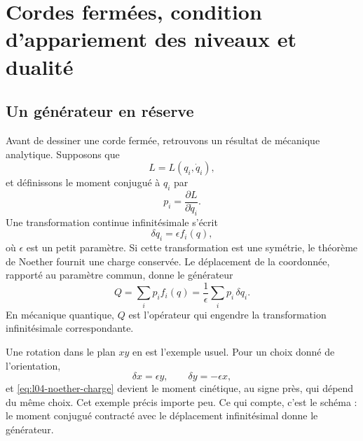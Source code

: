 \chapter{Cordes fermées, condition d’appariement des niveaux et dualité}


\section{Un générateur en réserve}

Avant de dessiner une corde fermée, retrouvons un résultat de mécanique analytique. Supposons que
\begin{equation}
  L=L(q_i,\dot q_i),
\end{equation}
et définissons le moment conjugué à \(q_i\) par
\begin{equation}
  p_i=\frac{\partial L}{\partial\dot q_i}.
\end{equation}
Une transformation continue infinitésimale s’écrit
\begin{equation}
  \delta q_i=\epsilon f_i(q),
  \label{eq:l04-infinitesimal-transformation}
\end{equation}
où \(\epsilon\) est un petit paramètre. Si cette transformation est une symétrie, le théorème de Noether fournit une charge conservée. Le déplacement de la coordonnée, rapporté au paramètre commun, donne le générateur
\begin{equation}
  Q=\sum_i p_i f_i(q)
   =\frac{1}{\epsilon}\sum_i p_i\,\delta q_i.
  \label{eq:l04-noether-charge}
\end{equation}
En mécanique quantique, \(Q\) est l’opérateur qui engendre la transformation infinitésimale correspondante.

Une rotation dans le plan \(xy\) en est l’exemple usuel. Pour un choix donné de l’orientation,
\begin{equation}
  \delta x=\epsilon y,
  \qquad
  \delta y=-\epsilon x,
\end{equation}
et \eqref{eq:l04-noether-charge} devient le moment cinétique, au signe près, qui dépend du même choix. Cet exemple précis importe peu. Ce qui compte, c’est le schéma : le moment conjugué contracté avec le déplacement infinitésimal donne le générateur.

